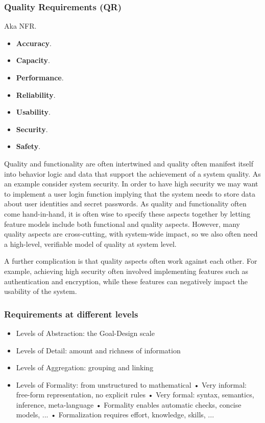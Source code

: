 \subsubsection{Quality Requirements (QR)}

Aka NFR.

\begin{itemize}
  \item \textbf{Accuracy}. 
  \item \textbf{Capacity}.
  \item \textbf{Performance}.
  \item \textbf{Reliability}.
  \item \textbf{Usability}.
  \item \textbf{Security}.
  \item \textbf{Safety}.
\end{itemize}

Quality and functionality are often intertwined and quality often manifest itself into behavior logic and data that support the achievement of a system quality. As an example consider system security. In order to have high security we may want to implement a user login function implying that the system needs to store data about user identities and secret passwords. As quality and functionality often come hand-in-hand, it is often wise to specify these aspects together by letting feature models include both functional and quality aspects. However, many quality aspects are cross-cutting, with system-wide impact, so we also often need a high-level, verifiable model of quality at system level. 

A further complication is that quality aspects often work against each other. For example, achieving high security often involved implementing features such as authentication and encryption, while these features can negatively impact the usability of the system.

\subsubsection{Requirements at different levels}

\begin{itemize}
  \item Levels of Abstraction: the Goal-Design scale
  \item Levels of Detail: amount and richness of information
  \item Levels of Aggregation: grouping and linking
  \item Levels of Formality: from unstructured to mathematical
  • Very informal: free-form
  representation, no explicit rules
  • Very formal: syntax, semantics,
  inference, meta-language
  • Formality enables automatic checks,
  concise models, ...
  • Formalization requires effort,
  knowledge, skills, ...
\end{itemize}


